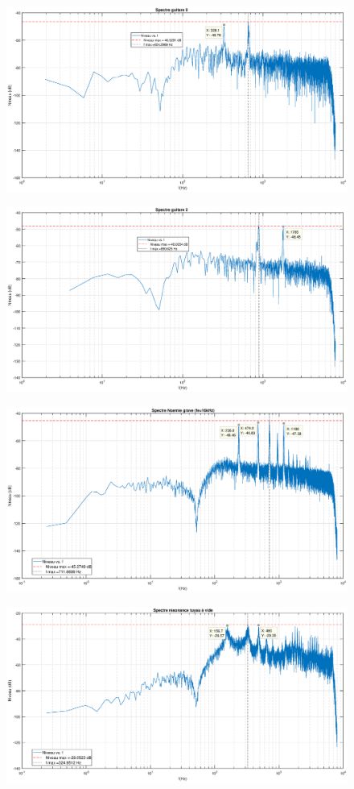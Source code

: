 \documentclass[12pt,a4paper]{article}
\begin{document}
\begin{figure}
	\centering
	\includegraphics[width=0.7\linewidth]{"res/guitare 1"}
	\caption{}
	\label{fig:guitare-1}
\end{figure}
\begin{figure}
	\centering
	\includegraphics[width=0.7\linewidth]{"res/guitare 2"}
	\caption{}
	\label{fig:guitare-2}
\end{figure}
\begin{figure}
	\centering
	\includegraphics[width=0.7\linewidth]{"res/Noemie grave"}
	\caption{}
	\label{fig:noemie-grave}
\end{figure}
\begin{figure}
	\centering
	\includegraphics[width=0.7\linewidth]{"res/Resonance tuyau a vide"}
	\caption{}
	\label{fig:resonance-tuyau-a-vide}
\end{figure}
\end{document}
